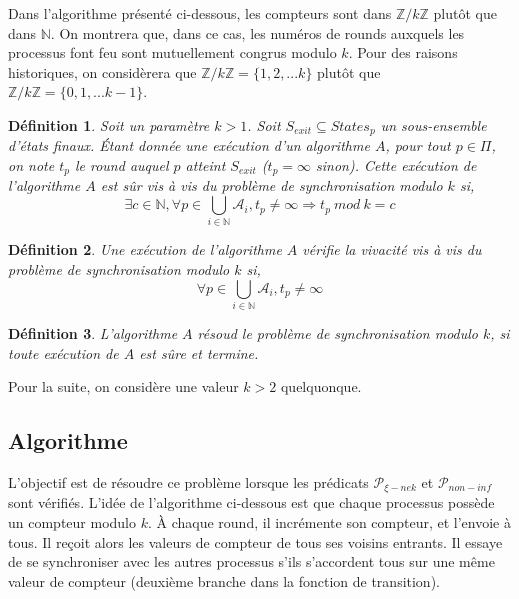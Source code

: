 \documentclass{article}
\newtheorem{definition}{Définition}
\begin{document}
Dans l'algorithme présenté ci-dessous, les compteurs sont dans $\mathds{Z}/k\mathds{Z}$ plutôt que dans $\mathds{N}$.
On montrera que, dans ce cas, les numéros de rounds auxquels les processus font feu sont mutuellement congrus modulo $k$.
Pour des raisons historiques, on considèrera que $\mathds{Z}/k\mathds{Z} = \{1, 2, ... k\}$ plutôt que $\mathds{Z}/k\mathds{Z} = \{0, 1, ... k-1\}$.

\begin{definition}

	Soit un paramètre $k > 1$. Soit $S_{exit} \subseteq States_p$ un sous-ensemble d'états finaux.
	Étant donnée une exécution d'un algorithme $A$, pour tout $p \in \Pi$, on note $t_p$ le round auquel $p$ atteint $S_{exit}$ ($t_p = \infty$ sinon).
	Cette exécution de l'algorithme $A$ est sûr vis à vis du problème de synchronisation modulo $k$ si,
	$$\exists c \in \mathds{N}, \forall p \in \bigcup\limits_{i \in \mathds{N}} \mathcal{A}_i, t_p \neq \infty \Rightarrow t_p~mod~k = c$$

\end{definition}

\begin{definition}

	Une exécution de l'algorithme $A$ vérifie la vivacité vis à vis du problème de synchronisation modulo $k$ si,
	$$\forall p \in \bigcup\limits_{i \in \mathds{N}} \mathcal{A}_i, t_p \neq \infty$$

\end{definition}
\begin{definition}
	L'algorithme $A$ résoud le problème de synchronisation modulo $k$, si toute exécution de $A$ est sûre et termine.
\end{definition}

Pour la suite, on considère une valeur $k > 2$ quelquonque.

\subsection{Algorithme}

L'objectif est de résoudre ce problème lorsque les prédicats $\mathcal{P}_{\xi-nek}$ et $\mathcal{P}_{non-inf}$ sont vérifiés.
L'idée de l'algorithme ci-dessous est que chaque processus possède un compteur modulo $k$. À chaque round, il incrémente son compteur, et l'envoie à tous.
Il reçoit alors les valeurs de compteur de tous ses voisins entrants. Il essaye de se synchroniser avec les autres processus s'ils s'accordent tous sur une même valeur de compteur
(deuxième branche dans la fonction de transition).
\end{document}
